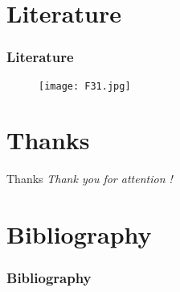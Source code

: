 \documentclass[pdflatex,compress,8pt,
	xcolor={dvipsnames,dvipsnames,svgnames,x11names,table},
	hyperref={
	breaklinks = true, 
	pdfauthor={Lemenkova Polina}, 
	pdfsubject={Preentation}, 
	pdfcreator={Lemenkova Polina}, 
	pdfproducer={Lemenkova Polina}, 
	colorlinks=true,linkcolor=blue, 
	citecolor=NavyBlue, 
	urlcolor = NavyBlue, 
	breaklinks = true}]{beamer}
\begin{document}
\section{Literature}
\begin{frame}\frametitle{Literature}
\begin{figure}[H]
	\centering
		\texttt{[image: F31.jpg]}
\end{figure}
\end{frame}

\section{Thanks}
\begin{frame}{Thanks}
  	\centering \LARGE 
  	\emph{Thank you for attention !}\\
\end{frame}



\section{Bibliography}
\begin{frame}[allowframebreaks]\frametitle{Bibliography}
	\nocite{*}
	\printbibliography[heading=none]
\end{frame}


\end{document}
